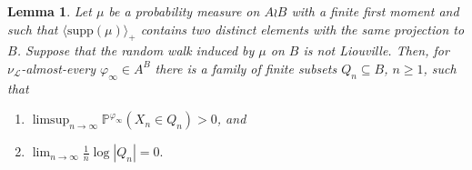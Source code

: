\documentclass[reqno,oneside,11pt]{amsart}
\renewcommand{\P}{\mathbb{P}}
\newcommand{\supp}[1]{\mathrm{supp}(#1)}
\theoremstyle{plain}
\newtheorem{lem}[thm]{Lemma}
\theoremstyle{definition}
\begin{document}
\begin{lem}\label{lem: sets for finite first moment entropy}
Let $\mu$ be a probability measure on $A\wr B$ with a finite first moment and such that $\langle\supp{\mu}\rangle_{+}$ contains two distinct elements with the same projection to $B$. Suppose that the random walk induced by $\mu$ on $B$ is not Liouville.	Then, for $\nu_{\mathcal{L}}$-almost-every $\varphi_{\infty}\in A^B$ there is a family of finite subsets $Q_n\subseteq B$, $n\ge 1$, such that
	\begin{enumerate}
		\item $\limsup_{n\to \infty}\P^{\varphi_{\infty}}(X_n\in Q_n)>0$, and
		\item $\lim_{n\to \infty}\frac{1}{n}\log|Q_n|=0.$
	\end{enumerate}
\end{lem}
\end{document}
